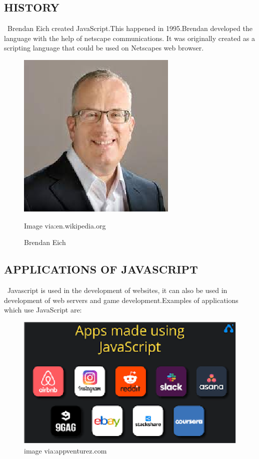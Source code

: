 \documentclass[12pt]{article}
\begin{document}
\subsection{HISTORY}
           \ Brendan Eich created JavaScript.This happened in 1995.Brendan developed the language with the help of netscape communications. It was originally created as a scripting language that could be used on Netscapes web browser.
           
\begin{figure}[h]
	\includegraphics[width=0.7\linewidth]{screenshot012}
	\caption{Brendan Eich}{Image via:en.wikipedia.org}
	\label{fig:screenshot012}
\end{figure}

\newpage

\subsection{APPLICATIONS OF JAVASCRIPT}
           \ Javascript is used in the development of websites, it can also be used in development of web servers and game development.Examples of applications which use JavaScript are:
           
           
\begin{figure}[h]
	\includegraphics[width=0.7\linewidth]{screenshot013}
	\caption{image via:appventurez.com}
	\label{fig:screenshot013}
\end{figure}
\end{document}
